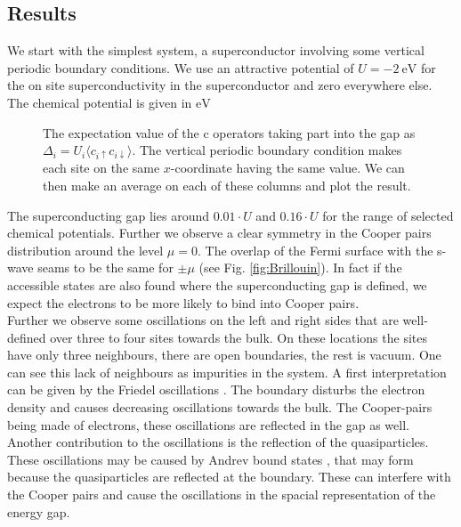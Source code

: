 \documentclass[..\main.tex]{subfile}
\begin{document}
\subsection{Results}
We start with the simplest system, a superconductor involving some vertical periodic boundary conditions.
We use an attractive potential of $U=\SI{-2}{\electronvolt}$ for the on site superconductivity in the superconductor and zero everywhere else.
The chemical potential is given in $\si{\electronvolt}$
\begin{figure}[H]
  \centering
  
  \caption{The expectation value of the c operators taking part into the gap as $\Delta_i = U_i\langle c_{i\uparrow}c_{i\downarrow}\rangle$. The  
  vertical periodic boundary condition makes each site on the same $x$-coordinate having the same value.
    We can then make an average on each of these columns and plot the result.}
\end{figure}
The superconducting gap lies around $0.01\cdot U$ and $0.16\cdot U$ for the range of selected chemical potentials. Further we observe a 
clear symmetry in the Cooper pairs distribution around the level $\mu =0$. The overlap of the Fermi surface with the s-wave seams
to be the same for $\pm\mu$ (see Fig. \ref{fig:Brillouin}). In fact if the accessible states are also found where the superconducting gap 
is defined, we expect the electrons to be more likely to bind into Cooper pairs.\\   
Further we observe some oscillations on the left and right sides that are well-defined over three to four sites towards the bulk. On these locations the sites have only three
neighbours, there are open boundaries, the rest is vacuum. One can see this lack of neighbours as impurities in the system. 
A first interpretation can be given by the Friedel oscillations \cite{Harrison1970}. The boundary disturbs the electron density and causes decreasing oscillations towards
the bulk. The Cooper-pairs being made of electrons, these oscillations are reflected in the gap as well. Another contribution to the oscillations
is the reflection of the quasiparticles.
These oscillations may be caused by Andrev bound states \cite{Bobkov_2024}, that may form because the quasiparticles are reflected at the boundary.
These can interfere with the Cooper pairs and cause the oscillations in the spacial representation of the energy gap.\\
\end{document}
